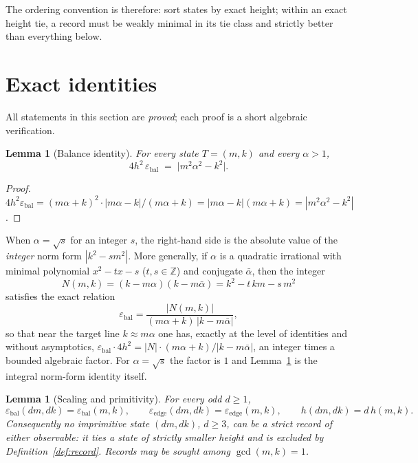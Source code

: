 \documentclass[11pt]{article}
\newtheorem{lemma}[theorem]{Lemma}
\theoremstyle{definition}
\theoremstyle{remark}
\newcommand{\eb}{\varepsilon_{\mathrm{bal}}}
\newcommand{\ee}{\varepsilon_{\mathrm{edge}}}
\newcommand{\ZZ}{\mathbb{Z}}
\begin{document}
The ordering convention is therefore: sort states by exact height; within an exact height tie, a record must be weakly minimal in its tie class and strictly better than everything below.

\section{Exact identities}\label{sec:identities}

All statements in this section are \emph{proved}; each proof is a short algebraic verification.

\begin{lemma}[Balance identity]\label{lem:balance}
For every state $T=(m,k)$ and every $\alpha>1$,
\[
\boxed{\ 4h^2\,\eb \;=\; \bigl|m^2\alpha^2-k^2\bigr|.\ }
\]
\end{lemma}

\begin{proof}
$4h^2\eb=(m\alpha+k)^2\cdot|m\alpha-k|/(m\alpha+k)=|m\alpha-k|(m\alpha+k)=|m^2\alpha^2-k^2|$.
\end{proof}

When $\alpha=\sqrt{s}$ for an integer $s$, the right-hand side is the absolute value of the \emph{integer} norm form $|k^2-sm^2|$. More generally, if $\alpha$ is a quadratic irrational with minimal polynomial $x^2-tx-s$ ($t,s\in\ZZ$) and conjugate $\bar\alpha$, then the integer
\begin{equation}\label{eq:normform}
N(m,k)=(k-m\alpha)(k-m\bar\alpha)=k^2-t\,km-s\,m^2
\end{equation}
satisfies the exact relation
\begin{equation}\label{eq:epsN}
\eb=\frac{|N(m,k)|}{(m\alpha+k)\,\bigl|k-m\bar\alpha\bigr|},
\end{equation}
so that near the target line $k\approx m\alpha$ one has, exactly at the level of identities and without asymptotics, $\eb\cdot 4h^2=|N|\cdot(m\alpha+k)/|k-m\bar\alpha|$, an integer times a bounded algebraic factor. For $\alpha=\sqrt s$ the factor is $1$ and Lemma~\ref{lem:balance} is the integral norm-form identity itself.

\begin{lemma}[Scaling and primitivity]\label{lem:scaling}
For every odd $d\ge1$,
\[
\eb(dm,dk)=\eb(m,k),\qquad \ee(dm,dk)=\ee(m,k),\qquad h(dm,dk)=d\,h(m,k).
\]
Consequently no imprimitive state $(dm,dk)$, $d\ge3$, can be a strict record of either observable: it ties a state of strictly smaller height and is excluded by Definition~\ref{def:record}. Records may be sought among $\gcd(m,k)=1$.
\end{lemma}
\end{document}
